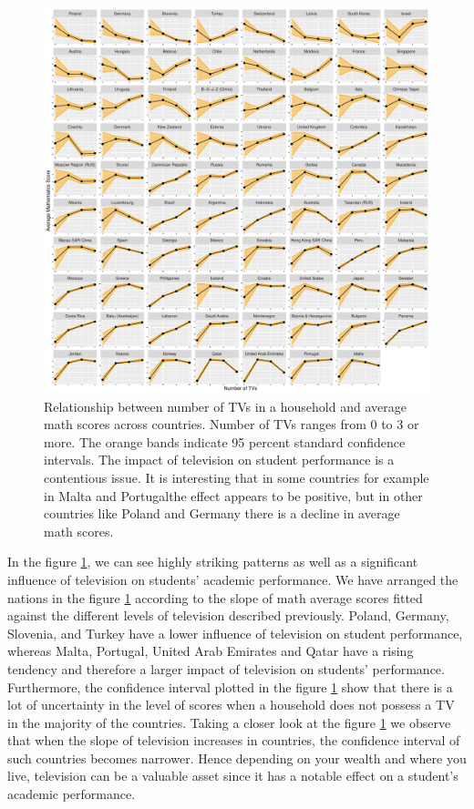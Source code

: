 \begin{Schunk}
\begin{figure}[H]
\includegraphics[width=1\linewidth]{learningtower_files/figure-latex/tv-plot-1} \caption[Relationship  between number of TVs in a household and average math scores across countries]{Relationship  between number of TVs in a household and average math scores across countries. Number of TVs ranges from 0 to 3 or more. The orange bands indicate 95 percent standard confidence intervals. The impact of television on student performance is a contentious issue. It is interesting that in some countries for example in Malta and Portugalthe effect appears to be positive, but in other countries like Poland and Germany there is a decline in average math scores.}\label{fig:tv-plot}
\end{figure}
\end{Schunk}

In the figure \ref{fig:tv-plot}, we can see highly striking patterns as
well as a significant influence of television on students' academic
performance. We have arranged the nations in the figure
\ref{fig:tv-plot} according to the slope of math average scores fitted
against the different levels of television described previously. Poland,
Germany, Slovenia, and Turkey have a lower influence of television on
student performance, whereas Malta, Portugal, United Arab Emirates and
Qatar have a rising tendency and therefore a larger impact of television
on students' performance. Furthermore, the confidence interval plotted
in the figure \ref{fig:tv-plot} show that there is a lot of uncertainty
in the level of scores when a household does not possess a TV in the
majority of the countries. Taking a closer look at the figure
\ref{fig:tv-plot} we observe that when the slope of television increases
in countries, the confidence interval of such countries becomes
narrower. Hence depending on your wealth and where you live, television
can be a valuable asset since it has a notable effect on a student's
academic performance.

